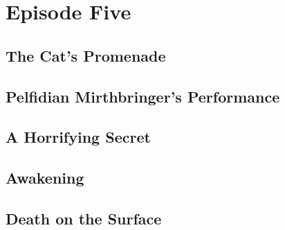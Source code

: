 \documentclass[././main.tex]{subfiles}
\begin{document}
\section{Episode Five}
\subsection{The Cat's Promenade}
\subsection{Pelfidian Mirthbringer's Performance}
\subsection{A Horrifying Secret}
\subsection{Awakening}
\subsection{Death on the Surface}
\end{document}
